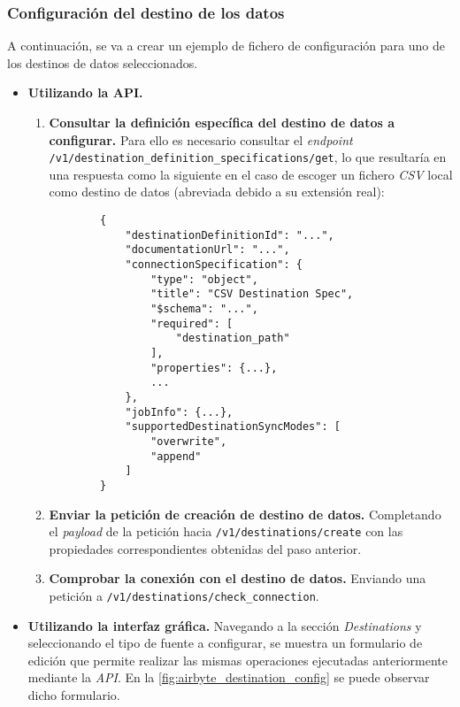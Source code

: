 \subsubsection{Configuración del destino de los datos}

A continuación, se va a crear un ejemplo de fichero de configuración para uno de los destinos de datos seleccionados.

\begin{itemize}
    
    \item \textbf{Utilizando la API.}
    
    \begin{enumerate}
        
        \item \textbf{Consultar la definición específica del destino de datos a configurar.} Para ello es necesario consultar el \textit{endpoint} \\ \verb|/v1/destination_definition_specifications/get|, lo que resultaría en una respuesta como la siguiente en el caso de escoger un fichero \textit{CSV} local como destino de datos (abreviada debido a su extensión real):

        \begin{verbatim}
        {
            "destinationDefinitionId": "...",
            "documentationUrl": "...",
            "connectionSpecification": {
                "type": "object",
                "title": "CSV Destination Spec",
                "$schema": "...",
                "required": [
                    "destination_path"
                ],
                "properties": {...},
                ...
            },
            "jobInfo": {...},
            "supportedDestinationSyncModes": [
                "overwrite",
                "append"
            ]
        }
        \end{verbatim}
        
        \item \textbf{Enviar la petición de creación de destino de datos.} Completando el \textit{payload} de la petición hacia \verb|/v1/destinations/create| con las propiedades correspondientes obtenidas del paso anterior. 
        
        \item \textbf{Comprobar la conexión con el destino de datos.} Enviando una petición a \verb|/v1/destinations/check_connection|.
    
    \end{enumerate}
    
    \item \textbf{Utilizando la interfaz gráfica.} Navegando a la sección \textit{Destinations} y seleccionando el tipo de fuente a configurar, se muestra un formulario de edición que permite realizar las mismas operaciones ejecutadas anteriormente mediante la \textit{API}. En la \autoref{fig:airbyte_destination_config} se puede observar dicho formulario.

    
\end{itemize}

